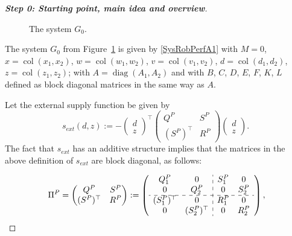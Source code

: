 \documentclass[11pt,a4paper,oneside,DIV=12,headings=small]{scrartcl}
\newcommand{\diag}{\operatorname{diag}}
\newcommand{\col}{\operatorname{col}}
\theoremstyle{plain}
\begin{document}
\begin{proof}[\textbf{Step 0: \emph{Starting point, main idea and overview}}]
\begin{figure}[h!]
\begin{tikzpicture}



 \end{tikzpicture}
\caption{The system $G_0$.}
\label{G0}
\end{figure}


The system $G_0$ from Figure~\ref{G0} is given by \eqref{SysRobPerfA1} with $M=0$, $x=\col(x_1,x_2)$, $w=\col(w_1,w_2)$, $v=\col(v_1,v_2)$, $d=\col(d_1,d_2)$, $z=\col(z_1,z_2)$; with $A=\diag(A_1,A_2)$ and with $B$, $C$, $D$, $E$, $F$, $K$, $L$ defined as block diagonal matrices in the same way as $A$. 

Let the external supply function be given by
\[
s_{ext}(d,z):=-\begin{pmatrix} d \\ z \end{pmatrix}^\top 
\begin{pmatrix} Q^P & S^P \\ (S^P)^\top & R^P \end{pmatrix}\begin{pmatrix} d \\ z \end{pmatrix}.\;
\]
The fact that $s_{ext}$ has an additive structure implies that the matrices in the above definition of $s_{ext}$ are block diagonal, as follows:

\begin{equation}
\label{FullPiP_53}
\Pi^P=\begin{pmatrix} Q^P & S^P \\ (S^P)^\top & R^P \end{pmatrix}:=\left( \begin{array}{c c : c c} 
Q_{1}^P & 0 & S_{1}^P & 0 \\ 
0 & Q_{2}^P & 0  & S_{2}^P \\  \hdashline 
(S_{1}^P)^\top & 0 & R_{1}^P & 0 \\ 
0 & (S_{2}^P)^\top & 0 & R_{2}^P
\end{array} \right),
\end{equation}


\end{proof}
\end{document}
